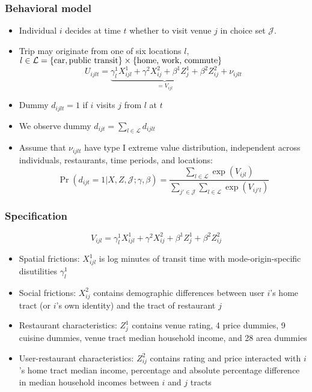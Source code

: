 \documentclass[11pt,notes=hide,aspectratio=169]{beamer}
\begin{document}
\begin{frame}
\frametitle{Behavioral model}
\begin{itemize}
	\item Individual $i$ decides at time $t$ whether to visit venue $j$ in choice set $\mathcal{J}$.
	\item Trip may originate from one of six locations $l$, $l \in \mathcal{L} = \left\{\textnormal{car},\textnormal{public transit}\right\} \times \{\textnormal{home, work, commute}\}$
	\begin{equation*}
	U_{ijlt} =\underbrace{\gamma_{l}^{1}X_{ijl}^{1}+\gamma^{2}X_{ij}^{2}+\beta^{1}Z_{j}^{1}+\beta^{2}Z_{ij}^{2}}_{ = V_{ijl}}+\nu_{ijlt}
 	\end{equation*}
	\item Dummy $d_{ijlt}=1$ if $i$ visits $j$ from $l$ at $t$
	\item We observe dummy 
	$d_{ijt} = \sum_{l\in\mathcal{L}}d_{ijlt}$
	\item Assume that $\nu_{ijlt}$ have type I extreme value distribution, independent across individuals, restaurants, time periods, and locations:
	\begin{equation*}
	\Pr(d_{ijt}=1|X,Z,\mathcal{J};\gamma,\beta)=\frac{\sum_{l\in\mathcal{L}}\exp(V_{ijl})}{\sum_{j'\in \mathcal{J}}\sum_{l\in\mathcal{L}}\exp(V_{ij'l})}
	\end{equation*}
\end{itemize}
\end{frame}
\begin{frame}
\frametitle{Specification}
\begin{equation*}
	V_{ijl} = \gamma_{l}^{1}X_{ijl}^{1}+\gamma^{2}X_{ij}^{2}+\beta^{1}Z_{j}^{1}+\beta^{2}Z_{ij}^{2} 
\end{equation*}
\begin{itemize}
	\item Spatial frictions: $X^{1}_{ijl}$ is log minutes of transit time with mode-origin-specific disutilities $\gamma^{1}_{l}$
	\item Social frictions: $X^{2}_{ij}$ contains demographic differences between user $i$'s home tract (or $i$'s own identity) and the tract of restaurant $j$
	\item Restaurant characteristics: $Z_{j}^{1}$ contains venue rating, 4 price dummies, 9 cuisine dummies, venue tract median household income, and 28 area dummies
	\item User-restaurant characteristics: $Z_{ij}^{2}$ contains rating and price interacted with $i$'s home tract median income, percentage and absolute percentage difference in median household incomes between $i$ and $j$ tracts %
\end{itemize}
\end{frame}
\end{document}
